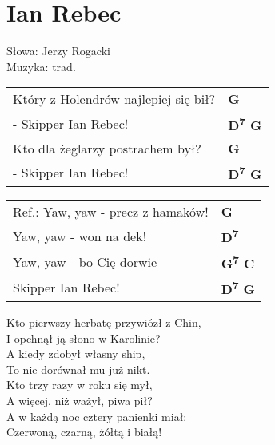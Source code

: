 \section{Ian Rebec}

Słowa: Jerzy Rogacki\\
Muzyka:  trad.

\vspace{2em}
\begin{tabular}{@{}p{7cm}@{}l@{}}
Który z Holendrów najlepiej się bił?  & \bfseries   G \\
- Skipper Ian Rebec!  & \bfseries   D\textsuperscript{7} G \\
Kto dla żeglarzy postrachem był?  & \bfseries   G \\
- Skipper Ian Rebec!  & \bfseries   D\textsuperscript{7} G \\
\end{tabular}

\vspace{1em}
\begin{tabular}{@{}p{7cm}@{}l@{}}
Ref.: Yaw, yaw - precz z hamaków!  & \bfseries   G \\
Yaw, yaw - won na dek!  & \bfseries   D\textsuperscript{7} \\
Yaw, yaw - bo Cię dorwie  & \bfseries   G\textsuperscript{7} C \\
Skipper Ian Rebec!  & \bfseries   D\textsuperscript{7} G \\
\end{tabular}

\vspace{1em}
Kto pierwszy herbatę przywiózł z Chin, \\
I opchnął ją słono w Karolinie? \\

A kiedy zdobył własny ship, \\
To nie dorównał mu już nikt. \\

Kto trzy razy w roku się mył, \\
A więcej, niż ważył, piwa pił? \\

A w każdą noc cztery panienki miał: \\
Czerwoną, czarną, żółtą i białą! \\
